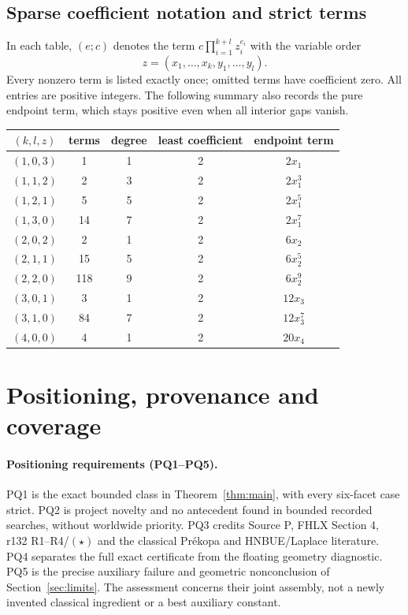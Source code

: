 \documentclass[11pt]{article}
\theoremstyle{remark}\newtheorem{remark}[theorem]{Remark}
\numberwithin{equation}{section}
\begin{document}
\subsection{Sparse coefficient notation and strict terms}
In each table, $(e;c)$ denotes the term $c\prod_{i=1}^{k+l}z_i^{e_i}$
with the variable order
\[z=(x_1,\ldots,x_k,y_1,\ldots,y_l).\]
Every nonzero term is listed exactly once; omitted terms have coefficient
zero. All entries are positive integers. The following summary also
records the pure endpoint term, which stays positive even when all
interior gaps vanish.
\begin{center}
\begin{tabular}{@{}ccccc@{}}\toprule
$(k,l,z)$ & terms & degree & least coefficient & endpoint term\\\midrule
$(1,0,3)$&1&1&2&$2x_1$\\
$(1,1,2)$&2&3&2&$2x_1^3$\\
$(1,2,1)$&5&5&2&$2x_1^5$\\
$(1,3,0)$&14&7&2&$2x_1^7$\\
$(2,0,2)$&2&1&2&$6x_2$\\
$(2,1,1)$&15&5&2&$6x_2^5$\\
$(2,2,0)$&118&9&2&$6x_2^9$\\
$(3,0,1)$&3&1&2&$12x_3$\\
$(3,1,0)$&84&7&2&$12x_3^7$\\
$(4,0,0)$&4&1&2&$20x_4$\\\bottomrule
\end{tabular}
\end{center}


\section{Positioning, provenance and coverage}\label{app:provenance}
\paragraph{Positioning requirements (PQ1--PQ5).}
PQ1 is the exact bounded class in Theorem~\ref{thm:main}, with every
six-facet case strict. PQ2 is project novelty and no antecedent found
in bounded recorded searches, without worldwide priority. PQ3 credits
Source P, FHLX Section 4, r132 R1--R4/$(\star)$ and the classical
Pr\'ekopa and HNBUE/Laplace literature. PQ4 separates the full exact
certificate from the floating geometry diagnostic. PQ5 is the precise
auxiliary failure and geometric nonconclusion of Section~\ref{sec:limits}.
The assessment concerns their joint assembly, not a newly invented
classical ingredient or a best auxiliary constant.
\end{document}
